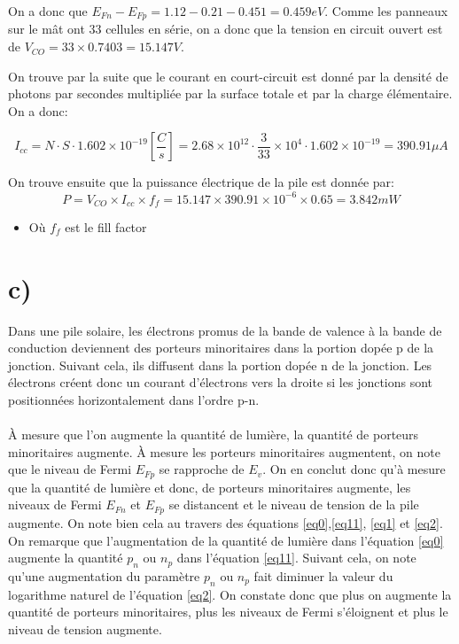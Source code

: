 On a donc que $E_{Fn} - E_{Fp} = 1.12 - 0.21 - 0.451 = 0.459eV$. Comme les panneaux sur le mât ont 33 cellules en série, on a donc que la tension en circuit ouvert est de $V_{CO} = 33\times 0.7403 = 15.147 V$.

On trouve par la suite que le courant en court-circuit est donné par la densité de photons par secondes multipliée par la surface totale et par la charge élémentaire. On a donc: 

\begin{equation}
I_{cc} = N\cdot S \cdot 1.602\times 10^{-19} \left[\frac{C}{s}\right] = 2.68 \times 10^{12} \cdot \frac{3}{33}\times 10^4 \cdot  1.602\times 10^{-19} = 390.91\mu A
\end{equation}

On trouve ensuite que la puissance électrique de la pile est donnée par:
\begin{equation}
P = V_{CO} \times I_{cc} \times f_f =  15.147 \times 390.91\times 10^{-6}\times 0.65 = 3.842mW
\end{equation}
\begin{itemize}
\item Où $f_f$ est le fill factor
\end{itemize}

\section{c)}
Dans une pile solaire, les électrons promus de la bande de valence à la bande de conduction deviennent des porteurs minoritaires dans la portion dopée p de la jonction. Suivant cela, ils diffusent dans la portion dopée n de la jonction. Les électrons créent donc un courant d'électrons vers la droite si les jonctions sont positionnées horizontalement dans l'ordre p-n.

\paragraph{} À mesure que l'on augmente la quantité de lumière, la quantité de porteurs minoritaires augmente. À mesure les porteurs minoritaires augmentent, on note que le niveau de Fermi $E_{Fp}$ se rapproche de $E_v$. On en conclut donc qu'à mesure que la quantité de lumière et donc, de porteurs minoritaires augmente, les niveaux de Fermi $E_{Fn}$ et $E_{Fp}$ se distancent et le niveau de tension de la pile augmente. On note bien cela au travers des équations \ref{eq0},\ref{eq11}, \ref{eq1} et \ref{eq2}. On remarque que l'augmentation de la quantité de lumière dans l'équation \ref{eq0} augmente la quantité $p_n$ ou $n_p$ dans l'équation \ref{eq11}. Suivant cela, on note qu'une augmentation du paramètre $p_n$ ou $n_p$ fait diminuer la valeur du logarithme naturel de l'équation \ref{eq2}. On constate donc que plus on augmente la quantité de porteurs minoritaires, plus les niveaux de Fermi s'éloignent et plus le niveau de tension augmente.

